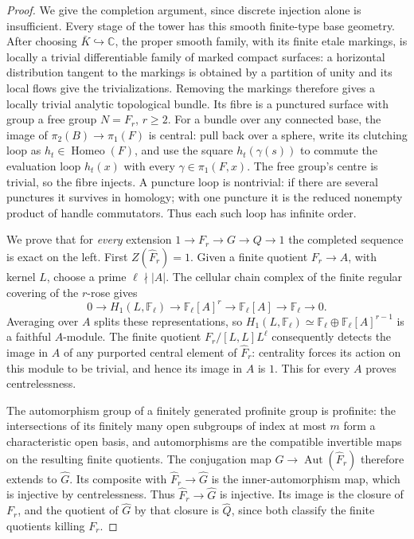 \begin{proof}
We give the completion argument, since discrete injection alone is
insufficient. Every stage of the tower has this smooth finite-type
base geometry. After choosing $\bar K\hookrightarrow\mathbb C$, the
proper smooth family, with its finite etale markings, is locally a
trivial differentiable family of marked compact surfaces: a horizontal
distribution tangent to the markings is obtained by a partition of
unity and its local flows give the trivializations. Removing the
markings therefore gives a locally trivial analytic topological bundle.
Its fibre is a punctured surface with group a free
group $N=F_r$, $r\ge2$. For a bundle over any connected base, the image
of $\pi_2(B)\to\pi_1(F)$ is central: pull back over a sphere, write its
clutching loop as $h_t\in\operatorname{Homeo}(F)$, and use the square
$h_t(\gamma(s))$ to commute the evaluation loop $h_t(x)$ with every
$\gamma\in\pi_1(F,x)$. The free group's centre is trivial, so the fibre
injects. A puncture loop is nontrivial: if there are several punctures
it survives in homology; with one puncture it is the reduced nonempty
product of handle commutators. Thus each such loop has infinite order.

We prove that for \emph{every} extension
$1\to F_r\to G\to Q\to1$ the completed sequence is exact on the left.
First $Z(\widehat F_r)=1$. Given a finite quotient $F_r\to A$, with
kernel $L$, choose a prime $\ell\nmid|A|$. The cellular chain complex
of the finite regular covering of the $r$-rose gives
\[
 0\longrightarrow H_1(L,\mathbb F_\ell)
 \longrightarrow\mathbb F_\ell[A]^r
 \longrightarrow\mathbb F_\ell[A]
 \longrightarrow\mathbb F_\ell\longrightarrow0.
\]
Averaging over $A$ splits these representations, so
$H_1(L,\mathbb F_\ell)\simeq
\mathbb F_\ell\oplus\mathbb F_\ell[A]^{r-1}$ is a faithful $A$-module.
The finite quotient $F_r/[L,L]L^\ell$ consequently detects the image in
$A$ of any purported central element of $\widehat F_r$: centrality
forces its action on this module to be trivial, and hence its image
in $A$ is $1$. This for every $A$ proves centrelessness.

The automorphism group of a finitely generated profinite group is
profinite: the intersections of its finitely many open subgroups of
index at most $m$ form a characteristic open basis, and automorphisms
are the compatible invertible maps on the resulting finite quotients.
The conjugation map
$G\to\operatorname{Aut}(\widehat F_r)$ therefore extends to
$\widehat G$. Its composite with
$\widehat F_r\to\widehat G$ is the inner-automorphism map, which is
injective by centrelessness. Thus $\widehat F_r\to\widehat G$ is
injective. Its image is the closure of $F_r$, and the quotient of
$\widehat G$ by that closure is $\widehat Q$, since both classify the
finite quotients killing $F_r$.


\end{proof}
